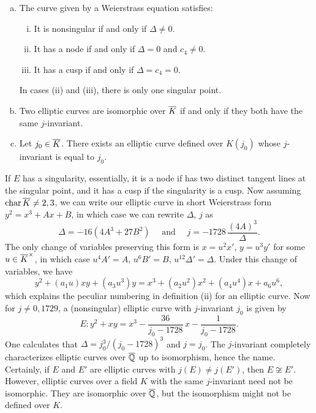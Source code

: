 \begin{prop} \hfill
\leavevmode\vspace{-1em}
        \begin{enumerate}[(a)] \itemsep-1em
        \item The curve given by a Weierstrass equation satisfies: \leavevmode\vspace{-1em}
            	\begin{enumerate}[(i)] \itemsep-1em
            	\item It is nonsingular if and only if $\Delta \neq 0$.
            	\item It has a node if and only if $\Delta= 0$ and $c_4 \neq 0$.
            	\item It has a cusp if and only if $\Delta= c_4= 0$.\leavevmode\vspace{-1em}
            	\end{enumerate} 
        In cases (ii) and (iii), there is only one singular point. 
        \item Two elliptic curves are isomorphic over $\overline{K}$ if and only if they both have the same $j$-invariant. 
        
        \item Let $j_0 \in \overline{K}$. There exists an elliptic curve defined over $K(j_0)$ whose $j$-invariant is equal to $j_0$. 
        \end{enumerate}
\end{prop}


If $E$ has a singularity, essentially, it is a node if has two distinct tangent lines at the singular point, and it has a cusp if the singularity is a cusp. Now assuming $\operatorname{char} \overline{K} \neq 2, 3$, we can write our elliptic curve in short Weierstrass form $y^2= x^3 + Ax + B$, in which case we can rewrite $\Delta$, $j$ as 
	\[
	\Delta= -16(4A^3 + 27B^2) \quad\text{ and }\quad j= -1728\, \dfrac{(4A)^3}{\Delta}.
	\]
The only change of variables preserving this form is $x= u^2x'$, $y= u^3y'$ for some $u \in \overline{K}^\times$, in which case $u^4A'= A$, $u^6B'= B$, $u^{12}\Delta'= \Delta$. Under this change of variables, we have
	\[
	y^2 + (a_1u)xy + (a_3u^3)y = x^3 + (a_2u^2)x^2 + (a_4u^4)x + a_6u^6,
	\]
which explains the peculiar numbering in definition (ii) for an elliptic curve. Now for $j \neq 0, 1729$, a (nonsingular) elliptic curve with $j$-invariant $j_0$ is given by
	\[
	E \colon y^2 + xy= x^3 - \dfrac{36}{j_0 - 1728}\,x - \dfrac{1}{j_0 - 1728}.
	\]
One calculates that $\Delta= j_0^3/ (j_0 - 1728)^3$ and $j= j_0$. The $j$-invariant completely characterizes elliptic curves over $\overline{\mathbb{Q}}$ up to isomorphism, hence the name. Certainly, if $E$ and $E'$ are elliptic curves with $j(E) \neq j(E')$, then $E \not\cong E'$. However, elliptic curves over a field $K$ with the same $j$-invariant need not be isomorphic. They are isomorphic over $\overline{\mathbb{Q}}$, but the isomorphism might not be defined over $K$. 


